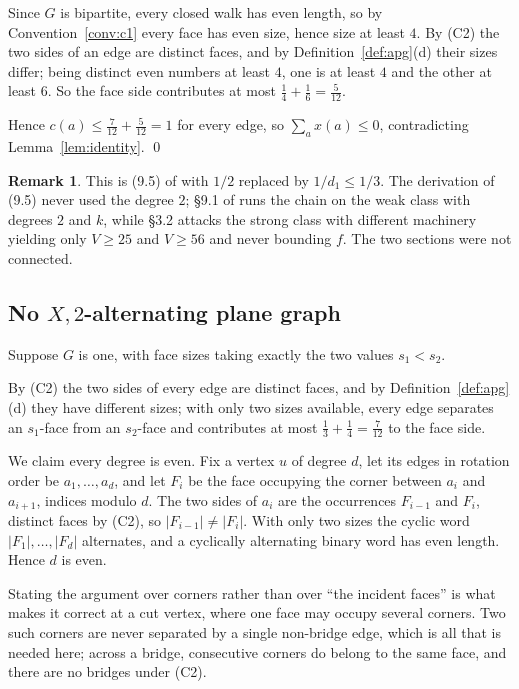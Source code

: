 \documentclass[11pt,a4paper]{amsart}
\theoremstyle{plain}
\theoremstyle{definition}
\newtheorem{remark}[theorem]{Remark}
\begin{document}
Since $G$ is bipartite, every closed walk has even length, so by
Convention~\ref{conv:c1} every face has even size, hence size at least $4$. By
(C2) the two sides of an edge are distinct faces, and by
Definition~\ref{def:apg}(d) their sizes differ; being distinct even numbers at
least $4$, one is at least $4$ and the other at least $6$. So the face side
contributes at most $\tfrac14 + \tfrac16 = \tfrac{5}{12}$.

Hence $c(a) \le \tfrac{7}{12} + \tfrac{5}{12} = 1$ for every edge, so
$\sum_a x(a) \le 0$, contradicting Lemma~\ref{lem:identity}. \qed

\begin{remark}
This is (9.5) of \cite{AHSSV2015} with $1/2$ replaced by $1/d_1 \le 1/3$. The
derivation of (9.5) never used the degree $2$; \S9.1 of \cite{AHSSV2015} runs
the chain on the weak class with degrees $2$ and $k$, while \S3.2 attacks the
strong class with different machinery yielding only $V \ge 25$ and $V \ge 56$
and never bounding $f$. The two sections were not connected.
\end{remark}

\subsection{No $X,2$-alternating plane graph}\label{sec:halftwo}

Suppose $G$ is one, with face sizes taking exactly the two values $s_1 < s_2$.

By (C2) the two sides of every edge are distinct faces, and by
Definition~\ref{def:apg}(d) they have different sizes; with only two sizes
available, every edge separates an $s_1$-face from an $s_2$-face and contributes
at most $\tfrac13 + \tfrac14 = \tfrac{7}{12}$ to the face side.

We claim every degree is even. Fix a vertex $u$ of degree $d$, let its edges in
rotation order be $a_1,\dots,a_d$, and let $F_i$ be the face occupying the
corner between $a_i$ and $a_{i+1}$, indices modulo $d$. The two sides of $a_i$
are the occurrences $F_{i-1}$ and $F_i$, distinct faces by (C2), so
$|F_{i-1}| \ne |F_i|$. With only two sizes the cyclic word
$|F_1|,\dots,|F_d|$ alternates, and a cyclically alternating binary word has
even length. Hence $d$ is even.

Stating the argument over corners rather than over ``the incident faces'' is
what makes it correct at a cut vertex, where one face may occupy several
corners. Two such corners are never separated by a single non-bridge edge,
which is all that is needed here; across a bridge, consecutive corners do belong
to the same face, and there are no bridges under (C2).
\end{document}
